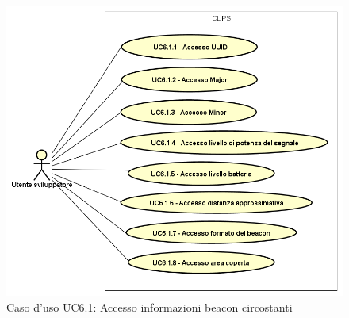 \documentclass[../AnalisiDeiRequisiti.tex]{subfiles}
\begin{document}
\begin{figure}[H]
	\centering
	\includegraphics[scale=0.95, width=\textwidth]{img/UC6-1.png}
	\caption{Caso d'uso UC6.1: Accesso informazioni beacon circostanti}\label{fig:UC6.1} 
\end{figure}
\end{document}
